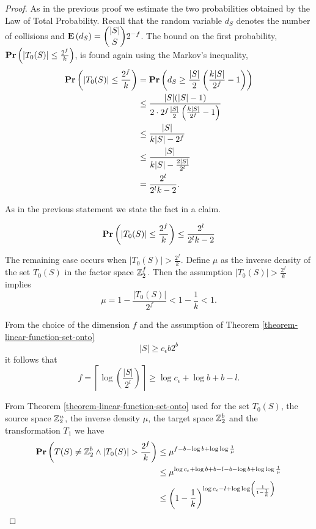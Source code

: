 \begin{proof}
As in the previous proof we estimate the two probabilities obtained by the Law of Total Probability. Recall that the random variable $d_S$ denotes the number of collisions and $\mathbf{E}\left(d_S\right) = \dbinom{|S|}{S}2 ^ {-f}$. The bound on the first probability, $\mathbf{Pr}\left(|T_0(S)| \leq \frac{2 ^ f}{k}\right)$, is found again using the Markov's inequality,
\[
\begin{split}
\mathbf{Pr}\left(|T_0(S)| \leq \frac{2 ^ f}{k}\right) 
	& =  \mathbf{Pr}\left(d_S \geq \frac{|S|}{2} \left( \frac{k|S|}{2 ^ f} - 1 \right)\right) \\
	& \leq \frac{|S|(|S| - 1)}{2 \cdot 2^f \frac{|S|}{2}\left(\frac{k|S|}{2 ^ f} - 1\right)} \\
	& \leq \frac{|S|}{k|S| - 2 ^ f} \\
	& \leq \frac{|S|}{k|S| - \frac{2|S|}{2^l}} \\ 
	& = \frac{2^l}{2^l k - 2} \text{.}
\end{split}
\]

As in the previous statement we state the fact in a claim.
\begin{claim}
\label{claim-better-c-e-probability-1}
\[
\mathbf{Pr}\left(|T_0(S)| \leq \frac{2 ^ f}{k}\right) \leq \frac{2^l}{2^l k - 2}
\]
\end{claim}

The remaining case occurs when $|T_0(S)| > \frac {2 ^ f}{k}$. Define $\mu$ as the inverse density of the set $T_0(S)$ in the factor space $\mathbb{Z}_{2}^{f}$. Then the assumption $|T_0(S)| > \frac {2 ^ f}{k}$ implies
\[
	\mu = 1 - \frac{|T_0(S)|}{2 ^ f} < 1 - \frac{1}{k} < 1 \text{.}
\]

From the choice of the dimension $f$ and the assumption of Theorem \ref{theorem-linear-function-set-onto} \[ |S| \geq c_\epsilon b 2 ^ b \] it follows that
\[
	f = \left\lceil \log \left( \frac{|S|}{2 ^ l} \right) \right\rceil \geq \log c_\epsilon + \log b  + b - l \text{.}
\]

From Theorem \ref{theorem-linear-function-set-onto} used for the set $T_0(S)$, the source space $\mathbb{Z}_{2}^{u}$, the inverse density $\mu$, the target space $\mathbb{Z}_{2}^{b}$ and the transformation $T_1$ we have 
\[
\begin{split}
\mathbf{Pr}\left(T(S) \neq \mathbb{Z}_{2}^{b} \wedge |T_0(S)| > \frac {2 ^ f}{k}\right) 
	& \leq \mu ^ {f - b - \log b + \log \log \frac{1}{\mu}} \\ 
	& \leq \mu ^ {\log c_\epsilon + \log b + b - l - b - \log b + \log \log \frac{1}{\mu}} \\ 
	& \leq \left(1 - \frac{1}{k}\right) ^ {\log c_\epsilon - l + \log \log \left(\frac{1}{1 - \frac{1}{k}} \right)}
\end{split}
\]


\end{proof}
